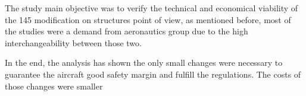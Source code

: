 
The study main objective was to verify the technical and economical viability of the 145 modification on structures point of view, as mentioned before, most of the studies were a demand from aeronautics group due to the high interchangeability between those two.

In the end, the analysis has shown the only small changes were necessary to guarantee the aircraft good safety margin and fulfill the regulations. The costs of those changes were smaller 